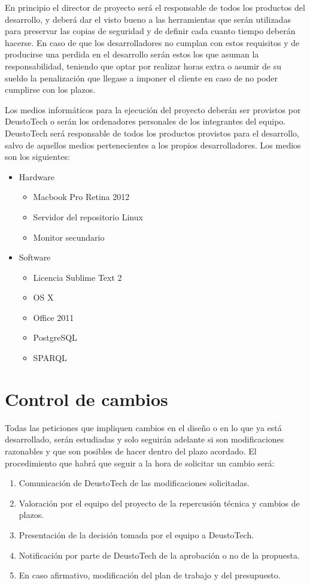 En principio el director de proyecto será el responsable de todos los productos del desarrollo, y deberá dar el visto bueno a las herramientas que serán utilizadas para preservar las copias de seguridad y de definir cada cuanto tiempo deberán hacerse. En caso de que los desarrolladores no cumplan con estos requisitos y de producirse una perdida en el desarrollo serán estos los que asuman la responsabilidad, teniendo que optar por realizar horas extra o asumir de su sueldo la penalización que llegase a imponer el cliente en caso de no poder cumplirse con los plazos.

Los medios informáticos para la ejecución del proyecto deberán ser provistos por DeustoTech o serán los ordenadores personales de los integrantes del equipo. DeustoTech será responsable de todos los productos provistos para el desarrollo, salvo de aquellos medios pertenecientes a los propios desarrolladores. Los medios son los siguientes: 

\begin{itemize}
	\item Hardware
	\begin{itemize}
		\item Macbook Pro Retina 2012
		\item Servidor del repositorio Linux
		\item Monitor secundario
	\end{itemize}
	\item Software
	\begin{itemize}
		\item Licencia Sublime Text 2
		\item OS X
		\item Office 2011
		\item PostgreSQL
		\item SPARQL
	\end{itemize}
\end{itemize}

\section{Control de cambios}

Todas las peticiones que impliquen cambios en el diseño o en lo que ya está desarrollado, serán estudiadas y solo seguirán adelante si son modificaciones razonables y que son posibles de hacer dentro del plazo acordado. El procedimiento que habrá que seguir a la hora de  solicitar un cambio será:

\begin{enumerate}
	\item Comunicación de DeustoTech de las modificaciones solicitadas.
	\item Valoración por el equipo del proyecto de la repercusión técnica y cambios de plazos.
	\item Presentación de la decisión tomada por el equipo a DeustoTech.
	\item Notificación por parte de DeustoTech de la aprobación o no de la propuesta.	
	\item En caso afirmativo, modificación del plan de trabajo y del presupuesto.
\end{enumerate}

